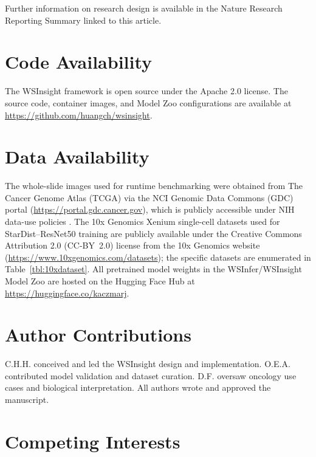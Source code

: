 \documentclass[sn-mathphys-num]{sn-jnl}%
\theoremstyle{thmstyleone}%
\theoremstyle{thmstyletwo}%
\theoremstyle{thmstylethree}%
\begin{document}
	Further information on research design is available in the Nature Research Reporting Summary linked to this article.
	
	
	\section{Code Availability}
	
	The WSInsight framework is open source under the Apache 2.0 license. The source code, container images, and Model Zoo configurations are available at \url{https://github.com/huangch/wsinsight}. %
	
	\section{Data Availability}
	
	The whole-slide images used for runtime benchmarking were obtained from The Cancer Genome Atlas (TCGA) via the NCI Genomic Data Commons (GDC) portal (\url{https://portal.gdc.cancer.gov}), which is publicly accessible under NIH data-use policies \cite{TheCancerGenomeAtlasProgramTCGA}. The 10x Genomics Xenium single-cell datasets used for StarDist--ResNet50 training are publicly available under the Creative Commons Attribution 2.0 (CC-BY~2.0) license from the 10x Genomics website (\url{https://www.10xgenomics.com/datasets}); the specific datasets are enumerated in Table~\ref{tbl:10xdataset}. All pretrained model weights in the WSInfer/WSInsight Model Zoo are hosted on the Hugging Face Hub at \url{https://huggingface.co/kaczmarj}.
	
	\section{Author Contributions}
	
	C.H.H. conceived and led the WSInsight design and implementation. O.E.A. contributed model validation and dataset curation. D.F. oversaw oncology use cases and biological interpretation. All authors wrote and approved the manuscript.
	
	\section{Competing Interests}
	
\end{document}
